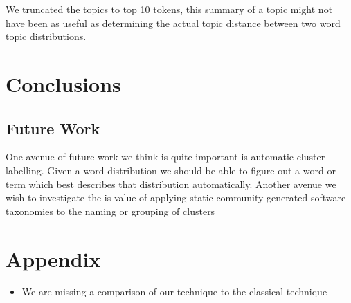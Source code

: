 \documentclass[times, 10pt,twocolumn]{article}
\begin{document}
We truncated the topics to top 10 tokens, this summary of a topic
might not have been as useful as determining the actual topic distance
between two word topic distributions.






\section{Conclusions}


\subsection{ Future Work}

One avenue of future work we think is quite important is automatic
cluster labelling. Given a word distribution we should be able to
figure out a word or term which best describes that distribution
automatically.
Another avenue we wish to investigate the is value of applying
static community generated software taxonomies to the naming or
grouping of clusters







%

\section{Appendix}

\begin{itemize}
\item We are missing a comparison of our technique to the classical technique
\end{itemize}
\end{document}
